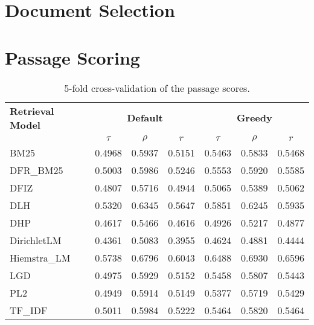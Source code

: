\section{Document Selection}\label{eval-doucment-selection}

\section{Passage Scoring}\label{eval-passage-scoring}

\begin{table}[h!]
    \centering
    \caption{5-fold cross-validation of the passage scores.}
    \begin{tabular}{lcccccc}
        \toprule
        \textbf{Retrieval Model} & \multicolumn{3}{c}{\textbf{Default}} & \multicolumn{3}{c}{\textbf{Greedy}} \\
        \cmidrule(lr){2-4} \cmidrule(lr){5-7}
                                 & $\tau$ & $\rho$ & $r$ & $\tau$ & $\rho$ & $r$ \\
        \midrule

        BM25         & 0.4968 & 0.5937 & 0.5151 & 0.5463 & 0.5833 & 0.5468 \\
        DFR\_BM25    & 0.5003 & 0.5986 & 0.5246 & 0.5553 & 0.5920 & 0.5585 \\
        DFIZ         & 0.4807 & 0.5716 & 0.4944 & 0.5065 & 0.5389 & 0.5062 \\
        DLH          & 0.5320 & 0.6345 & 0.5647 & 0.5851 & 0.6245 & 0.5935 \\
        DHP          & 0.4617 & 0.5466 & 0.4616 & 0.4926 & 0.5217 & 0.4877 \\
        DirichletLM  & 0.4361 & 0.5083 & 0.3955 & 0.4624 & 0.4881 & 0.4444 \\
        Hiemstra\_LM & 0.5738 & 0.6796 & 0.6043 & 0.6488 & 0.6930 & 0.6596 \\
        LGD          & 0.4975 & 0.5929 & 0.5152 & 0.5458 & 0.5807 & 0.5443 \\
        PL2          & 0.4949 & 0.5914 & 0.5149 & 0.5377 & 0.5719 & 0.5429 \\
        TF\_IDF      & 0.5011 & 0.5984 & 0.5222 & 0.5464 & 0.5820 & 0.5464 \\
        \bottomrule
    \end{tabular}
\end{table}


